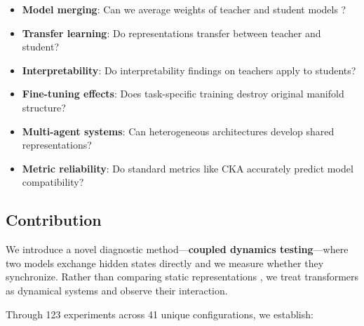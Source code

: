 \documentclass[10pt]{article} %
\theoremstyle{plain}
\theoremstyle{definition}
\theoremstyle{remark}
\begin{document}
\begin{itemize}
    \item \textbf{Model merging}: Can we average weights of teacher and student models \cite{wortsman2022model}?
    \item \textbf{Transfer learning}: Do representations transfer between teacher and student?
    \item \textbf{Interpretability}: Do interpretability findings on teachers apply to students?
    \item \textbf{Fine-tuning effects}: Does task-specific training destroy original manifold structure?
    \item \textbf{Multi-agent systems}: Can heterogeneous architectures develop shared representations?
    \item \textbf{Metric reliability}: Do standard metrics like CKA accurately predict model compatibility?
\end{itemize}

\subsection{Contribution}

We introduce a novel diagnostic method---\textbf{coupled dynamics testing}---where two models exchange hidden states directly and we measure whether they synchronize. Rather than comparing static representations \cite{kornblith2019similarity,ding2021grounding}, we treat transformers as dynamical systems \cite{haber2017stable,chen2018neuralode} and observe their interaction.

Through 123 experiments across 41 unique configurations, we establish:
\end{document}
